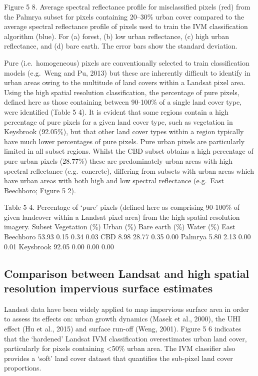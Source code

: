 \documentclass[]{book}
\begin{document}
Figure 5 8. Average spectral reflectance profile for misclassified
pixels (red) from the Palmrya subset for pixels containing 20--30\%
urban cover compared to the average spectral reflectance profile of
pixels used to train the IVM classification algorithm (blue). For (a)
forest, (b) low urban reflectance, (c) high urban reflectance, and (d)
bare earth. The error bars show the standard deviation.

Pure (i.e.~homogeneous) pixels are conventionally selected to train
classification models (e.g.~Weng and Pu, 2013) but these are inherently
difficult to identify in urban areas owing to the multitude of land
covers within a Landsat pixel area. Using the high spatial resolution
classification, the percentage of pure pixels, defined here as those
containing between 90-100\% of a single land cover type, were identified
(Table 5 4). It is evident that some regions contain a high percentage
of pure pixels for a given land cover type, such as vegetation in
Keysbrook (92.05\%), but that other land cover types within a region
typically have much lower percentages of pure pixels. Pure urban pixels
are particularly limited in all subset regions. Whilst the CBD subset
obtains a high percentage of pure urban pixels (28.77\%) these are
predominately urban areas with high spectral reflectance
(e.g.~concrete), differing from subsets with urban areas which have
urban areas with both high and low spectral reflectance (e.g.~East
Beechboro; Figure 5 2).

Table 5 4. Percentage of `pure' pixels (defined here as comprising
90-100\% of given landcover within a Landsat pixel area) from the high
spatial resolution imagery. Subset Vegetation (\%) Urban (\%) Bare earth
(\%) Water (\%) East Beechboro 53.93 0.15 0.34 0.03 CBD 8.98 28.77 0.35
0.00 Palmrya 5.80 2.13 0.00 0.01 Keysbrook 92.05 0.00 0.00 0.00

\subsection{Comparison between Landsat and high spatial resolution
impervious surface
estimates}\label{comparison-between-landsat-and-high-spatial-resolution-impervious-surface-estimates}

Landsat data have been widely applied to map impervious surface area in
order to assess its effects on: urban growth dynamics (Masek et al.,
2000), the UHI effect (Hu et al., 2015) and surface run-off (Weng,
2001). Figure 5 6 indicates that the `hardened' Landsat IVM
classification overestimates urban land cover, particularly for pixels
containing \textless{}50\% urban area. The IVM classifier also provides
a `soft' land cover dataset that quantifies the sub-pixel land cover
proportions.
\end{document}
